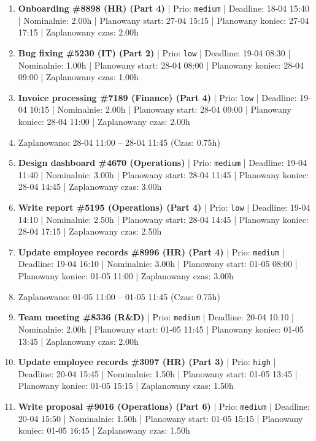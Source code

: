 {\begin{enumerate}
  \item [\textbf{14636}] \textbf{Onboarding \#8898 (HR) (Part 4)} | Prio: \texttt{medium} | Deadline: 18-04 15:40 | Nominalnie: 2.00h | Planowany start: 27-04 15:15 | Planowany koniec: 27-04 17:15 | Zaplanowany czas: 2.00h
  \item [\textbf{14680}] \textbf{Bug fixing \#5230 (IT) (Part 2)} | Prio: \texttt{low} | Deadline: 19-04 08:30 | Nominalnie: 1.00h | Planowany start: 28-04 08:00 | Planowany koniec: 28-04 09:00 | Zaplanowany czas: 1.00h
  \item [\textbf{14678}] \textbf{Invoice processing \#7189 (Finance) (Part 4)} | Prio: \texttt{low} | Deadline: 19-04 10:15 | Nominalnie: 2.00h | Planowany start: 28-04 09:00 | Planowany koniec: 28-04 11:00 | Zaplanowany czas: 2.00h
  \item [\textbf{PRZERWA}] Zaplanowano: 28-04 11:00 -- 28-04 11:45 (Czas: 0.75h)
  \item [\textbf{14676}] \textbf{Design dashboard \#4670 (Operations)} | Prio: \texttt{medium} | Deadline: 19-04 11:40 | Nominalnie: 3.00h | Planowany start: 28-04 11:45 | Planowany koniec: 28-04 14:45 | Zaplanowany czas: 3.00h
  \item [\textbf{14687}] \textbf{Write report \#5195 (Operations) (Part 4)} | Prio: \texttt{low} | Deadline: 19-04 14:10 | Nominalnie: 2.50h | Planowany start: 28-04 14:45 | Planowany koniec: 28-04 17:15 | Zaplanowany czas: 2.50h
  \item [\textbf{14655}] \textbf{Update employee records \#8996 (HR) (Part 4)} | Prio: \texttt{medium} | Deadline: 19-04 16:10 | Nominalnie: 3.00h | Planowany start: 01-05 08:00 | Planowany koniec: 01-05 11:00 | Zaplanowany czas: 3.00h
  \item [\textbf{PRZERWA}] Zaplanowano: 01-05 11:00 -- 01-05 11:45 (Czas: 0.75h)
  \item [\textbf{14649}] \textbf{Team meeting \#8336 (R\&D)} | Prio: \texttt{medium} | Deadline: 20-04 10:10 | Nominalnie: 2.00h | Planowany start: 01-05 11:45 | Planowany koniec: 01-05 13:45 | Zaplanowany czas: 2.00h
  \item [\textbf{14621}] \textbf{Update employee records \#3097 (HR) (Part 3)} | Prio: \texttt{high} | Deadline: 20-04 15:45 | Nominalnie: 1.50h | Planowany start: 01-05 13:45 | Planowany koniec: 01-05 15:15 | Zaplanowany czas: 1.50h
  \item [\textbf{14662}] \textbf{Write proposal \#9016 (Operations) (Part 6)} | Prio: \texttt{medium} | Deadline: 20-04 15:50 | Nominalnie: 1.50h | Planowany start: 01-05 15:15 | Planowany koniec: 01-05 16:45 | Zaplanowany czas: 1.50h

\end{enumerate}}
